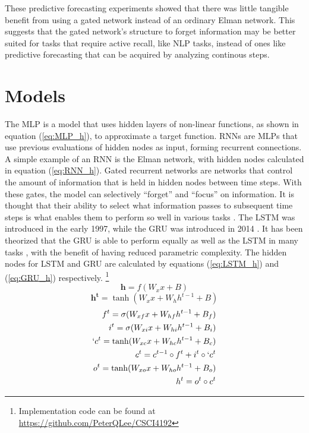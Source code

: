 \documentclass[11pt]{article}
\begin{document}
These predictive forecasting experiments showed that there was
little tangible benefit from using a gated network instead of an
ordinary Elman network. This suggests that
the gated network's structure to forget information may be
better suited for tasks that require active recall, like NLP tasks, instead of ones like
predictive forecasting that can be acquired by analyzing continous steps.

\section{Models}
The MLP is a model that uses hidden layers of non-linear functions, as shown in equation (\ref{eq:MLP_h}),
to approximate a target function. RNNs are MLPs that use previous evaluations
of hidden nodes as input, forming recurrent connections. A simple example of an RNN is the Elman network, with hidden nodes calculated in
equation (\ref{eq:RNN_h}).
Gated recurrent networks are networks that control the
amount of information that is held in hidden nodes between time
steps. With these gates, the model can selectively ``forget''
and ``focus'' on information. It is thought that their ability to select what information
passes to subsequent time steps is what enables them to perform so
well in various tasks \cite{LSTM}. The LSTM was introduced in the early
1997, while the GRU was introduced in 2014 \cite{GRU}. It has been theorized
that the GRU is able to perform equally as well as the LSTM in many tasks \cite{Chung}, with the benefit of having reduced parametric complexity. 
The hidden nodes for
LSTM and GRU are calculated by equations (\ref{eq:LSTM_h}) and (\ref{eq:GRU_h})
respectively. \footnote{Implementation code can be found at \url{https://github.com/PeterQLee/CSCI4192}}
\begin{equation}
\mathbf{h} = f( W_xx+B)
\label{eq:MLP_h}
\end{equation}
\begin{equation}
\mathbf{h^t} = \tanh(W_xx+W_hh^{t-1}+B)
\label{eq:RNN_h}
\end{equation}
\begin{equation}
\begin{split}
f^{t} = \sigma(W_{xf}x + W_{hf}h^{t-1}+B_f) \\
i^{t} = \sigma(W_{xi}x + W_{hi}h^{t-1}+B_i) \\
`c^{t} = \tanh(W_{xc}x+W_{hc}h^{t-1}+B_c) \\
c^{t} = c^{t-1} \circ f^{t} + i^{t} \circ `c^{t} \\
o^{t}= \tanh (W_{xo}x + W_{ho}h^{t-1} + B_o) \\
h^{t} = o^{t} \circ c^{t}  \\
\end{split}
   \label{eq:LSTM_h}
\end{equation}
\end{document}
